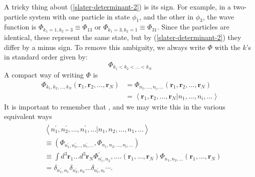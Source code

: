 A tricky thing about (\ref{slater-determinant-2}) is its sign. For example, in a two-particle system with one particle in state $\phi_{1}$, and the other in $\phi_3$, the wave function is $\Phi_{k_1=1,k_2=3}\equiv\Phi_{13}$ or $\Phi_{k_1=3,k_2=1}\equiv\Phi_{31}$. Since the particles are identical, these represent the same state, but by (\ref{slater-determinant-2}) they differ by a minus sign. To remove this ambiguity, we always write $\Phi$ with the $k$'s in standard order given by:
\begin{equation}\Phi_{k_{1}<k_{2}<\ldots<k_{N}}\end{equation}
A compact way of writing $\Phi$ is
\begin{equation}\begin{aligned}
\Phi_{k_{1}, k_{2}, \ldots, k_{N}}\left(\mathbf{r}_{1}, \mathbf{r}_{2}, \ldots, \mathbf{r}_{N}\right) &=\Phi_{n_{1}, \ldots, n_{i}, \ldots}\left(\mathbf{r}_{1}, \mathbf{r}_{2}, \ldots, \mathbf{r}_{N}\right) \\
&=\left\langle\mathbf{r}_{1}, \mathbf{r}_{2}, \dots, \mathbf{r}_{N} | n_{1}, \dots, n_{i}, \dots\right\rangle
\end{aligned}\end{equation}
It is important to remember that , and we may write this in the various equivalent ways
\begin{equation}\begin{array}{l}
\begin{aligned}
&\left\langle n_{1}^{\prime}, n_{2}^{\prime}, \ldots, n_{1}^{\prime}, \ldots | n_{1}, n_{2}, \ldots, n_{1}, \ldots\right\rangle  \\
& \equiv\left(\Phi_{n_{1}^{\prime}, n_{2}^{\prime}\ldots, n_{l}^{\prime}, \ldots} , \Phi_{n_{1}, n_{2}, \ldots, n_{l}, \ldots}\right) \\
& \equiv \int d^{3} \mathbf{r}_{1} \ldots d^{3} \mathbf{r}_{N} \Phi_{n_{1}^{\prime}, n_{2}}^{\prime}, \ldots .\left(\mathbf{r}_{1}, \ldots, \mathbf{r}_{N}\right) \Phi_{n_{1}, n_{2}, \ldots}\left(\mathbf{r}_{1}, \ldots, \mathbf{r}_{N}\right) \\
&=\delta_{n_{1}^{\prime}, n_{1}} \delta_{n_{2}^{\prime}, n_{2}} \ldots \delta_{n_{l}^{\prime}, n_{l}} \cdots .
\end{aligned}
\end{array}\end{equation}